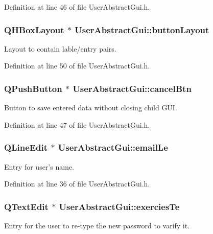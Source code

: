 Definition at line 46 of file User\-Abstract\-Gui.\-h.

\hypertarget{class_user_abstract_gui_abbe97aecb48e75d88cfc6fe87149930b}{
\subsubsection[{button\-Layout}]{\setlength{\rightskip}{0pt plus 5cm}Q\-H\-Box\-Layout $\ast$ User\-Abstract\-Gui\-::button\-Layout\hspace{0.3cm}{\ttfamily [private]}}}\label{class_user_abstract_gui_abbe97aecb48e75d88cfc6fe87149930b}
Layout to contain lable/entry pairs. 

Definition at line 50 of file User\-Abstract\-Gui.\-h.

\hypertarget{class_user_abstract_gui_ae1b73e2d98c40db351bb87e96d9070b4}{
\subsubsection[{cancel\-Btn}]{\setlength{\rightskip}{0pt plus 5cm}Q\-Push\-Button $\ast$ User\-Abstract\-Gui\-::cancel\-Btn\hspace{0.3cm}{\ttfamily [private]}}}\label{class_user_abstract_gui_ae1b73e2d98c40db351bb87e96d9070b4}
Button to save entered data without closing child G\-U\-I. 

Definition at line 47 of file User\-Abstract\-Gui.\-h.

\hypertarget{class_user_abstract_gui_aff0b81d70ad0e9c5b140b78d9932d334}{
\subsubsection[{email\-Le}]{\setlength{\rightskip}{0pt plus 5cm}Q\-Line\-Edit $\ast$ User\-Abstract\-Gui\-::email\-Le\hspace{0.3cm}{\ttfamily [private]}}}\label{class_user_abstract_gui_aff0b81d70ad0e9c5b140b78d9932d334}
Entry for user's name. 

Definition at line 36 of file User\-Abstract\-Gui.\-h.

\hypertarget{class_user_abstract_gui_accbf7028eeb10900a87717ff261ac7c9}{
\subsubsection[{exercies\-Te}]{\setlength{\rightskip}{0pt plus 5cm}Q\-Text\-Edit $\ast$ User\-Abstract\-Gui\-::exercies\-Te\hspace{0.3cm}{\ttfamily [private]}}}\label{class_user_abstract_gui_accbf7028eeb10900a87717ff261ac7c9}
Entry for the user to re-\/type the new password to varify it. 

